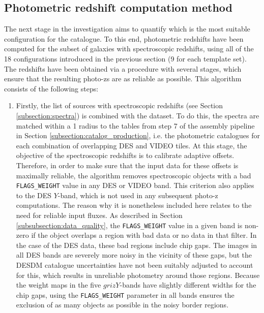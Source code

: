 \subsection{Photometric redshift computation method}\label{subsection:photoz_computation_method}
The next stage in the investigation aims to quantify which is the most suitable configuration for the \DESVIDEO catalogue. To this end, photometric redshifts have been computed for the subset of galaxies with spectroscopic redshifts, using all of the 18 configurations introduced in the previous section (9 for each template set). The redshifts have been obtained via a procedure with several stages, which ensure that the resulting photo-zs are as reliable as possible. This algorithm consists of the following steps: 

\begin{enumerate}
    \item Firstly, the list of sources with spectroscopic redshifts (see Section \ref{subsection:spectra}) is combined with the \DESVIDEO dataset. To do this, the spectra are matched within a \SI{1}{\arcsec} radius to the \DESVIDEO tables from step 7 of the assembly pipeline in Section \ref{subsection:catalog_production}, i.e. the photometric catalogues for each combination of overlapping DES and VIDEO tiles. At this stage, the objective of the spectroscopic redshifts is to calibrate adaptive offsets. Therefore, in order to make sure that the input data for these offsets is maximally reliable, the algorithm removes spectroscopic objects with a bad \texttt{FLAGS\_WEIGHT} value in any DES or VIDEO band. This criterion also applies to the DES $Y$-band, which is not used in any subsequent photo-z computations. The reason why it is nonetheless included here relates to the need for reliable input fluxes. As described in Section \ref{subsubsection:data_quality}, the \texttt{FLAGS\_WEIGHT} value in a given band is non-zero if the object overlaps a region with bad data or no data in that filter. In the case of the DES data, these bad regions include chip gaps. The images in all DES bands are severely more noisy in the vicinity of these gaps, but the DESDM catalogue uncertainties have not been suitably adjusted to account for this, which results in unreliable photometry around those regions. Because the weight maps in the five $grizY$-bands have slightly different widths for the chip gaps, using the \texttt{FLAGS\_WEIGHT} parameter in all bands ensures the exclusion of as many objects as possible in the noisy border regions. 
    

\end{enumerate}
